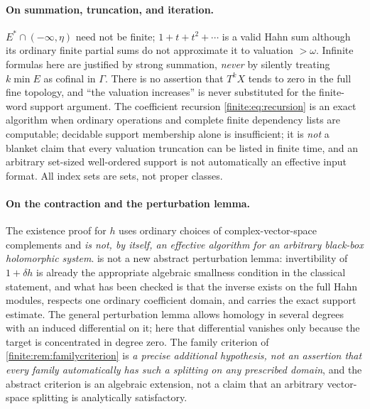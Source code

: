 \documentclass[11pt,letterpaper]{article}
\theoremstyle{definition}
\theoremstyle{remark}
\numberwithin{equation}{section}
\begin{document}
\paragraph{On summation, truncation, and iteration.}
$E^*\cap(-\infty,\eta)$ need not be finite; $1+t+t^2+\cdots$ is a valid Hahn sum although its ordinary finite partial sums do not approximate it to valuation $>\omega$. Infinite formulas here are justified by strong summation, \emph{never} by silently treating $k\min E$ as cofinal in $\Gamma$. There is no assertion that $T^kX$ tends to zero in the full fine topology, and ``the valuation increases'' is never substituted for the finite-word support argument. The coefficient recursion \eqref{finite:eq:recursion} is an exact algorithm when ordinary operations and complete finite dependency lists are computable; decidable support membership alone is insufficient; it is \emph{not} a blanket claim that every valuation truncation can be listed in finite time, and an arbitrary set-sized well-ordered support is not automatically an effective input format. All index sets are sets, not proper classes.

\paragraph{On the contraction and the perturbation lemma.}
The existence proof for $h$ uses ordinary choices of complex-vector-space complements and \emph{is not, by itself, an effective algorithm for an arbitrary black-box holomorphic system}.  is not a new abstract perturbation lemma: invertibility of $1+\delta h$ is already the appropriate algebraic smallness condition in the classical statement, and what has been checked is that the inverse exists on the full Hahn modules, respects one ordinary coefficient domain, and carries the exact support estimate. The general perturbation lemma allows homology in several degrees with an induced differential on it; here that differential vanishes only because the target is concentrated in degree zero. The family criterion of \cref{finite:rem:familycriterion} is \emph{a precise additional hypothesis, not an assertion that every family automatically has such a splitting on any prescribed domain}, and the abstract criterion is an algebraic extension, not a claim that an arbitrary vector-space splitting is analytically satisfactory.
\end{document}
